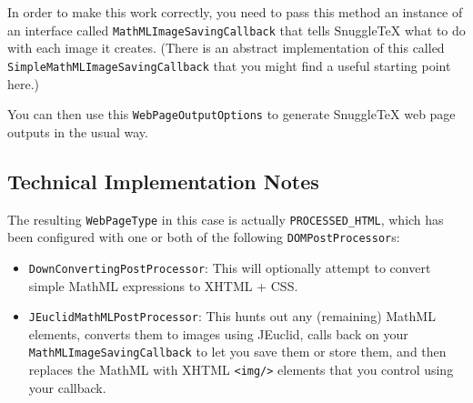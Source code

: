 In order to make this work correctly, you need to pass this method an instance of
an interface called \verb|MathMLImageSavingCallback| that tells SnuggleTeX what to do
with each image it creates. (There is an abstract implementation of this called
\verb|SimpleMathMLImageSavingCallback| that you might find a useful starting point here.)

You can then use this \verb|WebPageOutputOptions| to generate SnuggleTeX web page
outputs in the usual way.

\subsection*{Technical Implementation Notes}

The resulting \verb|WebPageType| in this case is actually \verb|PROCESSED_HTML|,
which has been configured with one or both of the following \verb|DOMPostProcessor|s:

\begin{itemize}
\item \verb|DownConvertingPostProcessor|: This will optionally attempt to convert
simple MathML expressions to XHTML + CSS.

\item \verb|JEuclidMathMLPostProcessor|: This hunts out any (remaining) MathML elements,
converts them to images using JEuclid, calls back on your \verb|MathMLImageSavingCallback|
to let you save them or store them, and then replaces the MathML with XHTML
\verb|<img/>| elements that you control using your callback.

\end{itemize}
